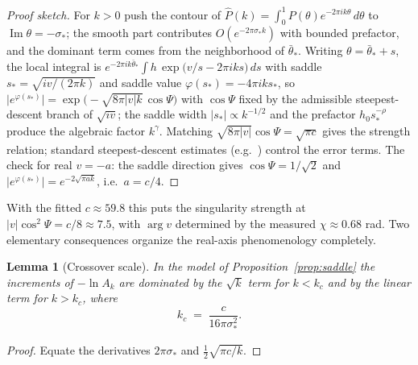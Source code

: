 \documentclass[11pt,a4paper]{article}
\newtheorem{lemma}[theorem]{Lemma}
\theoremstyle{definition}
\theoremstyle{remark}
\begin{document}
\begin{proof}[Proof sketch]
For $k>0$ push the contour of $\widehat P(k)=\int_0^1P(\theta)e^{-2\pi ik\theta}\,d\theta$ to
$\operatorname{Im}\theta=-\sigma_*$; the smooth part contributes
$O(e^{-2\pi\sigma_*k})$ with bounded prefactor, and the dominant term comes from the
neighborhood of $\bar\theta_*$. Writing $\theta=\bar\theta_*+s$, the local integral is
$e^{-2\pi ik\bar\theta_*}\int h\,\exp\bigl(v/s-2\pi iks\bigr)\,ds$ with saddle
$s_*=\sqrt{iv/(2\pi k)}$ and saddle value $\varphi(s_*)=-4\pi iks_*$, so
$\lvert e^{\varphi(s_*)}\rvert=\exp\bigl(-\sqrt{8\pi\lvert v\rvert k}\,\cos\Psi\bigr)$ with
$\cos\Psi$ fixed by the admissible steepest-descent branch of $\sqrt{iv}$; the saddle width
$\lvert s_*\rvert\propto k^{-1/2}$ and the prefactor $h_0 s_*^{-\rho}$ produce the algebraic
factor $k^{\gamma}$. Matching $\sqrt{8\pi\lvert v\rvert}\cos\Psi=\sqrt{\pi c}$ gives the
strength relation; standard steepest-descent estimates (e.g.\ \cite[Ch.~4]{olver}) control
the error terms. The check for real $v=-a$: the saddle direction gives
$\cos\Psi=1/\sqrt2$ and $\lvert e^{\varphi(s_*)}\rvert=e^{-2\sqrt{\pi a k}}$, i.e.\ $a=c/4$.
\end{proof}

With the fitted $c\approx59.8$ this puts the singularity strength at
$\lvert v\rvert\cos^2\Psi=c/8\approx7.5$, with $\arg v$ determined by the measured
$\chi\approx0.68$ rad. Two elementary consequences organize the real-axis phenomenology
completely.

\begin{lemma}[Crossover scale]\label{lem:crossover}
In the model of Proposition~\ref{prop:saddle} the increments of $-\ln A_k$ are dominated by
the $\sqrt k$ term for $k<k_c$ and by the linear term for $k>k_c$, where
\[
k_c\;=\;\frac{c}{16\pi\sigma_*^2}.
\]
\end{lemma}

\begin{proof}
Equate the derivatives $2\pi\sigma_*$ and $\tfrac12\sqrt{\pi c/k}$.
\end{proof}
\end{document}
